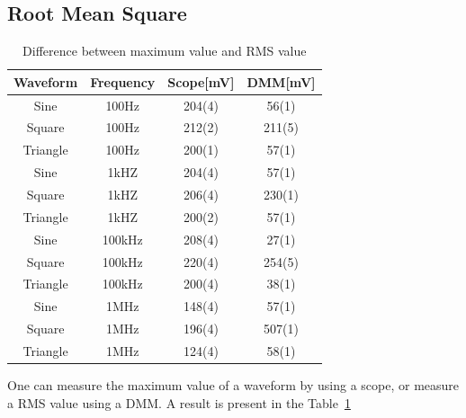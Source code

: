 \documentclass[aps,prl,reprint]{revtex4-1}
\begin{document}
    \subsection{Root Mean Square}
    \begin{table}[h]
    \begin{ruledtabular}
    \begin{tabular}{cccc} 
    Waveform & Frequency & Scope{[}mV{]} & DMM{[}mV{]} \\ \hline\hline
    Sine     & 100Hz     & 204(4)        & 56(1)       \\ \hline
    Square   & 100Hz     & 212(2)        & 211(5)      \\ \hline
    Triangle & 100Hz     & 200(1)        & 57(1)       \\ \hline
    Sine     & 1kHZ      & 204(4)        & 57(1)       \\ \hline
    Square   & 1kHZ      & 206(4)        & 230(1)      \\ \hline
    Triangle & 1kHZ      & 200(2)        & 57(1)       \\ \hline
    Sine     & 100kHz    & 208(4)        & 27(1)       \\ \hline
    Square   & 100kHz    & 220(4)        & 254(5)      \\ \hline
    Triangle & 100kHz    & 200(4)        & 38(1)       \\ \hline
    Sine     & 1MHz      & 148(4)        & 57(1)       \\ \hline
    Square   & 1MHz      & 196(4)        & 507(1)      \\ \hline
    Triangle & 1MHz      & 124(4)        & 58(1)       \\ 
    \end{tabular}
    \end{ruledtabular}
    \caption{Difference between maximum value and RMS value}
    \label{table:6}
    \end{table} 
    One can measure the maximum value of a waveform by using a scope, or measure a RMS value using a DMM. A result is present in the Table~\ref{table:6}
\end{document}
